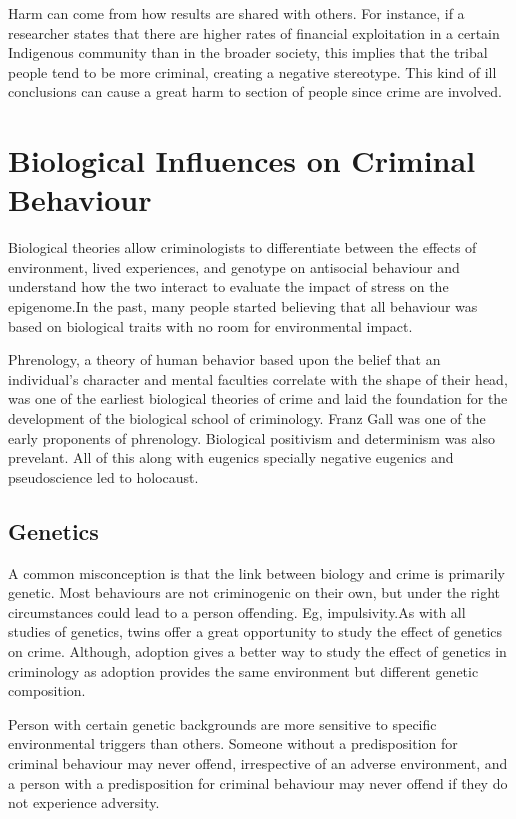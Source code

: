 \documentclass{article}
\begin{document}
Harm can come from how results are shared with others. For instance, if a researcher states that there are higher rates of financial exploitation in a certain Indigenous community than in the broader society, this implies that the tribal people tend to be more criminal, creating a negative stereotype. This kind of ill conclusions can cause a great harm to section of people since crime are involved.

\section{Biological Influences on Criminal Behaviour}

Biological theories allow criminologists to differentiate between the effects of environment, lived experiences, and genotype on antisocial behaviour and understand how the two interact to evaluate the impact of stress on the epigenome.In the past, many people started believing that all behaviour was based on biological traits with no room for environmental impact.

Phrenology, a theory of human behavior based upon the belief that an individual’s character and mental faculties correlate with the shape of their head, was one of the earliest biological theories of crime and laid the foundation for the development of the biological school of criminology. Franz Gall was one of the early proponents of phrenology. Biological positivism and determinism was also prevelant. All of this along with eugenics specially negative eugenics and pseudoscience led to holocaust.

\subsection{Genetics}

A common misconception is that  the link between biology and crime is primarily genetic. Most behaviours are not criminogenic on their own, but under the right circumstances could lead to a person offending. Eg, impulsivity.As with all studies of genetics, twins offer a great opportunity to study the effect of genetics on crime. Although, adoption gives a better way to study the effect of genetics in criminology as adoption provides the same environment but different genetic composition.

Person with certain genetic backgrounds are more sensitive to specific environmental triggers than others. Someone without a predisposition for criminal behaviour may never offend, irrespective of an adverse environment, and a person with a predisposition for criminal behaviour may never offend if they do not experience adversity.
\end{document}
